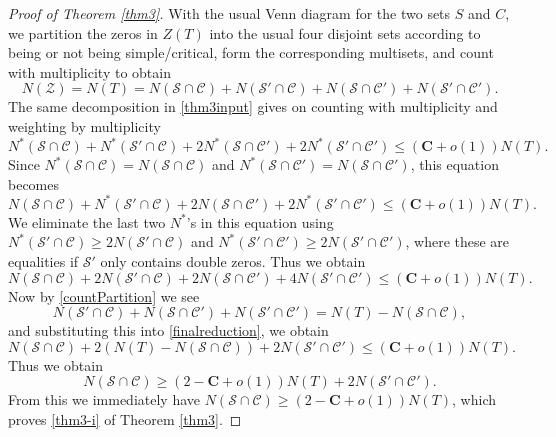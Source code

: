 \documentclass[11pt]{amsart}
\theoremstyle{remark}
\theoremstyle{plain}
\numberwithin{equation}{section}
\begin{document}
\begin{proof}[Proof of Theorem \ref{thm3}]

With the usual Venn diagram for the two sets $S$ and $C$, we partition the zeros in $Z(T)$ into the usual four disjoint sets according to being or not being simple/critical, form the corresponding multisets, and count with multiplicity to obtain
\begin{equation} \label{countPartition}
N(\mathcal{Z})= N(T) = N(\mathcal{S}\cap\mathcal{C}) + N(\mathcal{S'}\cap\mathcal{C}) + N(\mathcal{S}\cap\mathcal{C'}) + N(\mathcal{S'}\cap\mathcal{C'}). \end{equation}
The same decomposition in \eqref{thm3input} gives on counting with multiplicity and weighting by multiplicity
\begin{equation} \label{count*} N^*(\mathcal{S}\cap\mathcal{C}) + N^*(\mathcal{S'}\cap\mathcal{C}) + 2N^*(\mathcal{S}\cap\mathcal{C'}) + 2N^*(\mathcal{S'}\cap\mathcal{C'})\le (\mathbf{C}+o(1))N(T).\end{equation}
Since $N^*(\mathcal{S}\cap\mathcal{C}) = N(\mathcal{S}\cap\mathcal{C})$ and $N^*(\mathcal{S}\cap\mathcal{C'}) = N(\mathcal{S}\cap\mathcal{C'})$, 
this equation becomes 
\[ N(\mathcal{S}\cap\mathcal{C}) + N^*(\mathcal{S'}\cap\mathcal{C}) + 2N(\mathcal{S}\cap\mathcal{C'}) + 2N^*(\mathcal{S'}\cap\mathcal{C'})\le (\mathbf{C}+o(1))N(T).\]
We eliminate the last two $N^*$'s in this equation using 
$N^*(\mathcal{S'}\cap\mathcal{C})\ge 2N(\mathcal{S'}\cap\mathcal{C})$ and $N^*(\mathcal{S'}\cap\mathcal{C'}) \ge 2N(\mathcal{S'}\cap\mathcal{C'})$, where these are equalities if $\mathcal{S'}$ only contains double zeros. Thus we obtain
\begin{equation} \label{finalreduction} N(\mathcal{S}\cap\mathcal{C}) + 2N(\mathcal{S'}\cap\mathcal{C}) + 2N(\mathcal{S}\cap\mathcal{C'}) + 4N(\mathcal{S'}\cap\mathcal{C'})\le (\mathbf{C}+o(1))N(T).\end{equation}
Now by \eqref{countPartition} we see 
\[ N(\mathcal{S'}\cap\mathcal{C}) + N(\mathcal{S}\cap\mathcal{C'}) + N(\mathcal{S'}\cap\mathcal{C'}) = N(T) - N(\mathcal{S}\cap\mathcal{C}),\]
and substituting this into \eqref{finalreduction}, we obtain 
\[N(\mathcal{S}\cap\mathcal{C}) + 2(N(T) - N(\mathcal{S}\cap\mathcal{C}))+ 2N(\mathcal{S'}\cap\mathcal{C'}) \le (\mathbf{C}+o(1))N(T). \]
Thus we obtain
\begin{equation} \label{mainfirstresult}N(\mathcal{S}\cap\mathcal{C}) \ge (2-\mathbf{C} +o(1))N(T) + 2N(\mathcal{S'}\cap\mathcal{C'}). \end{equation}
From this we immediately have $ N(\mathcal{S}\cap\mathcal{C}) \ge (2-\mathbf{C} +o(1))N(T)$, which proves \ref{thm3-i} of Theorem \ref{thm3}. 


\end{proof}
\end{document}
